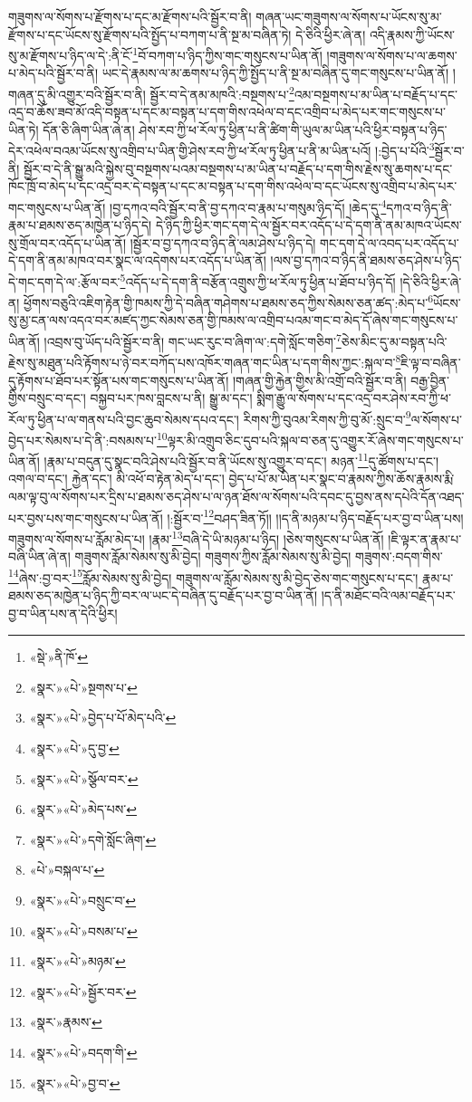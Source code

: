 གཟུགས་ལ་སོགས་པ་རྫོགས་པ་དང་མ་རྫོགས་པའི་སྦྱོར་བ་ནི། གཞན་ཡང་གཟུགས་ལ་སོགས་པ་ཡོངས་སུ་མ་རྫོགས་པ་དང་ཡོངས་སུ་རྫོགས་པའི་སྤྱོད་པ་བཀག་པ་ནི་སྔ་མ་བཞིན་ཏེ། དེ་ཅིའི་ཕྱིར་ཞེ་ན། འདི་རྣམས་ཀྱི་ཡོངས་སུ་མ་རྫོགས་པ་ཉིད་ལ་དེ་:ནི་ངོ་\footnote{«སྡེ་»ནི་ཁོ་}བོ་བཀག་པ་ཉིད་ཀྱིས་གང་གསུངས་པ་ཡིན་ནོ། །གཟུགས་ལ་སོགས་པ་ལ་ཆགས་པ་མེད་པའི་སྦྱོར་བ་ནི། ཡང་དེ་རྣམས་ལ་མ་ཆགས་པ་ཉིད་ཀྱི་སྤྱོད་པ་ནི་སྔ་མ་བཞིན་དུ་གང་གསུངས་པ་ཡིན་ནོ། །གཞན་དུ་མི་འགྱུར་བའི་སྦྱོར་བ་ནི། སྦྱོར་བ་དེ་ནམ་མཁའི་:བསྔགས་པ་\footnote{«སྣར་»«པེ་»སྔགས་པ་}འམ་བསྔགས་པ་མ་ཡིན་པ་བརྗོད་པ་དང་འདྲ་བ་ཆོས་ཟབ་མོ་འདི་བསྟན་པ་དང་མ་བསྟན་པ་དག་གིས་འཕེལ་བ་དང་འགྲིབ་པ་མེད་པར་གང་གསུངས་པ་ཡིན་ཏེ། དོན་ཅི་ཞིག་ཡིན་ཞེ་ན། ཤེས་རབ་ཀྱི་ཕ་རོལ་ཏུ་ཕྱིན་པ་ནི་ཚིག་གི་ཡུལ་མ་ཡིན་པའི་ཕྱིར་བསྟན་པ་ཉིད་དེར་འཕེལ་བའམ་ཡོངས་སུ་འགྲིབ་པ་ཡིན་གྱི་ཤེས་རབ་ཀྱི་ཕ་རོལ་ཏུ་ཕྱིན་པ་ནི་མ་ཡིན་པའོ། །:བྱེད་པ་པོའི་\footnote{«སྣར་»«པེ་»བྱེད་པ་པོ་མེད་པའི་}སྦྱོར་བ་ནི། སྦྱོར་བ་དེ་ནི་སྒྱུ་མའི་སྐྱེས་བུ་བསྔགས་པའམ་བསྔགས་པ་མ་ཡིན་པ་བརྗོད་པ་དག་གིས་རྗེས་སུ་ཆགས་པ་དང་ཁོང་ཁྲོ་བ་མེད་པ་དང་འདྲ་བར་དེ་བསྟན་པ་དང་མ་བསྟན་པ་དག་གིས་འཕེལ་བ་དང་ཡོངས་སུ་འགྲིབ་པ་མེད་པར་གང་གསུངས་པ་ཡིན་ནོ། །བྱ་དཀའ་བའི་སྦྱོར་བ་ནི་བྱ་དཀའ་བ་རྣམ་པ་གསུམ་ཉིད་དོ། །ཆེད་དུ་\footnote{«སྣར་»«པེ་»དུ་བྱ་}དཀའ་བ་ཉིད་ནི་རྣམ་པ་ཐམས་ཅད་མཁྱེན་པ་ཉིད་དེ། དེ་ཉིད་ཀྱི་ཕྱིར་གང་དག་དེ་ལ་སྦྱོར་བར་འདོད་པ་དེ་དག་ནི་ནམ་མཁའ་ཡོངས་སུ་གྲོལ་བར་འདོད་པ་ཡིན་ནོ། །སྦྱོར་བ་བྱ་དཀའ་བ་ཉིད་ནི་ལམ་ཤེས་པ་ཉིད་དེ། གང་དག་དེ་ལ་འབད་པར་འདོད་པ་དེ་དག་ནི་ནམ་མཁའ་བར་སྣང་ལ་འདེགས་པར་འདོད་པ་ཡིན་ནོ། །ལས་བྱ་དཀའ་བ་ཉིད་ནི་ཐམས་ཅད་ཤེས་པ་ཉིད་དེ་གང་དག་དེ་ལ་:རྩོལ་བར་\footnote{«སྣར་»«པེ་»སྩོལ་བར་}འདོད་པ་དེ་དག་ནི་བརྩོན་འགྲུས་ཀྱི་ཕ་རོལ་ཏུ་ཕྱིན་པ་ཐོབ་པ་ཉིད་དོ། །དེ་ཅིའི་ཕྱིར་ཞེ་ན། ཕྱོགས་བཅུའི་འཇིག་རྟེན་གྱི་ཁམས་ཀྱི་དེ་བཞིན་གཤེགས་པ་ཐམས་ཅད་ཀྱིས་སེམས་ཅན་ཚད་:མེད་པ་\footnote{«སྣར་»«པེ་»མེད་པས་}ཡོངས་སུ་མྱ་ངན་ལས་འདའ་བར་མཛད་ཀྱང་སེམས་ཅན་གྱི་ཁམས་ལ་འགྲིབ་པའམ་གང་བ་མེད་དོ་ཞེས་གང་གསུངས་པ་ཡིན་ནོ། །འབྲས་བུ་ཡོད་པའི་སྦྱོར་བ་ནི། གང་ཡང་རུང་བ་ཞིག་ལ་:དགེ་སློང་གཅིག་\footnote{«སྣར་»«པེ་»དགེ་སློང་ཞིག་}ཅེས་མིང་དུ་མ་བསྟན་པའི་རྗེས་སུ་མཐུན་པའི་རྟོགས་པ་ཉེ་བར་བཀོད་པས་འཁོར་གཞན་གང་ཡིན་པ་དག་གིས་ཀྱང་:སྐལ་བ་\footnote{«པེ་»བསྐལ་པ་}ཇི་ལྟ་བ་བཞིན་དུ་རྟོགས་པ་ཐོབ་པར་སྟོན་པས་གང་གསུངས་པ་ཡིན་ནོ། །གཞན་གྱི་རྐྱེན་གྱིས་མི་འགྲོ་བའི་སྦྱོར་བ་ནི། བརྒྱ་བྱིན་གྱིས་བསྲུང་བ་དང་། བསྐྱབ་པར་ཁས་བླངས་པ་ནི། སྒྱུ་མ་དང་། སྨིག་རྒྱུ་ལ་སོགས་པ་དང་འདྲ་བར་ཤེས་རབ་ཀྱི་ཕ་རོལ་ཏུ་ཕྱིན་པ་ལ་གནས་པའི་བྱང་ཆུབ་སེམས་དཔའ་དང་། རིགས་ཀྱི་བུའམ་རིགས་ཀྱི་བུ་མོ་:སྲུང་བ་\footnote{«སྣར་»«པེ་»བསྲུང་བ་}ལ་སོགས་པ་བྱེད་པར་སེམས་པ་དེ་ནི་:བསམས་པ་\footnote{«སྣར་»«པེ་»བསམ་པ་}ལྟར་མི་འགྲུབ་ཅིང་དུབ་པའི་སྐལ་བ་ཅན་དུ་འགྱུར་རོ་ཞེས་གང་གསུངས་པ་ཡིན་ནོ། །རྣམ་པ་བདུན་དུ་སྣང་བའི་ཤེས་པའི་སྦྱོར་བ་ནི་ཡོངས་སུ་འགྱུར་བ་དང་། མཉན་\footnote{«སྣར་»«པེ་»མཉམ་}དུ་ཚོགས་པ་དང་། འགལ་བ་དང་། རྐྱེན་དང་། མི་འཕོ་བ་རྟེན་མེད་པ་དང་། བྱེད་པ་པོ་མ་ཡིན་པར་སྣང་བ་རྣམས་ཀྱིས་ཆོས་རྣམས་རྨི་ལམ་ལྟ་བུ་ལ་སོགས་པར་དྲིས་པ་ཐམས་ཅད་ཤེས་པ་ལ་ཉན་ཐོས་ལ་སོགས་པའི་དབང་དུ་བྱས་ནས་དཔེའི་དོན་འཐད་པར་བྱས་པས་གང་གསུངས་པ་ཡིན་ནོ། །:སྦྱོར་བ་\footnote{«སྣར་»«པེ་»སྦྱོར་བར་}བཤད་ཟིན་ཏོ།། །།ད་ནི་མཉམ་པ་ཉིད་བརྗོད་པར་བྱ་བ་ཡིན་པས། གཟུགས་ལ་སོགས་པ་རློམ་མེད་པ། །རྣམ་\footnote{«སྣར་»རྣམས་}བཞི་དེ་ཡི་མཉམ་པ་ཉིད། །ཅེས་གསུངས་པ་ཡིན་ནོ། །ཇི་ལྟར་ན་རྣམ་པ་བཞི་ཡིན་ཞེ་ན། གཟུགས་རློམ་སེམས་སུ་མི་བྱེད། གཟུགས་ཀྱིས་རློམ་སེམས་སུ་མི་བྱེད། གཟུགས་:བདག་གིས་\footnote{«སྣར་»«པེ་»བདག་གི་}ཞེས་:བྱ་བར་\footnote{«སྣར་»«པེ་»བྱ་བ་}རློམ་སེམས་སུ་མི་བྱེད། གཟུགས་ལ་རློམ་སེམས་སུ་མི་བྱེད་ཅེས་གང་གསུངས་པ་དང་། རྣམ་པ་ཐམས་ཅད་མཁྱེན་པ་ཉིད་ཀྱི་བར་ལ་ཡང་དེ་བཞིན་དུ་བརྗོད་པར་བྱ་བ་ཡིན་ནོ། །ད་ནི་མཐོང་བའི་ལམ་བརྗོད་པར་བྱ་བ་ཡིན་པས་ན་དེའི་ཕྱིར། 